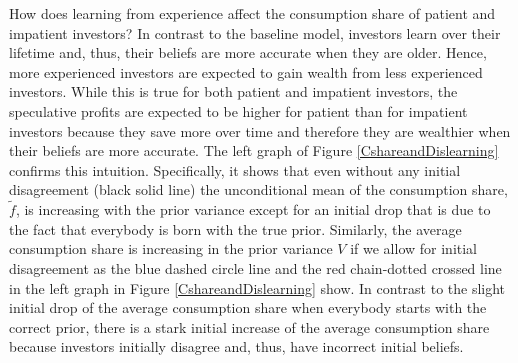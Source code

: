 How does learning from experience affect the consumption share of patient and impatient investors? In contrast to the baseline model, investors learn over their lifetime and, thus, their beliefs are more accurate when they are older. Hence, more experienced investors are expected to gain wealth from less experienced investors. While this is true for both patient and impatient investors, the speculative profits are expected to be higher for patient than for impatient investors because they save more over time and therefore they are wealthier when their beliefs are more accurate.  The left graph of Figure \ref{CshareandDislearning} confirms this intuition. Specifically, it shows that even without any initial disagreement (black solid line) the unconditional mean of the consumption share, $\tilde{f}$, is increasing with the prior variance except for an initial drop that is due to the fact that everybody is born with the true prior.  Similarly, the average consumption share is increasing in the prior variance $V$ if we allow for initial disagreement as the blue dashed circle line and the red chain-dotted crossed line in the left graph in Figure \ref{CshareandDislearning} show. In contrast to the slight initial drop of the average consumption share when everybody starts with the correct prior, there is a stark initial increase of the average consumption share because investors initially disagree and, thus, have incorrect initial beliefs. 
  

